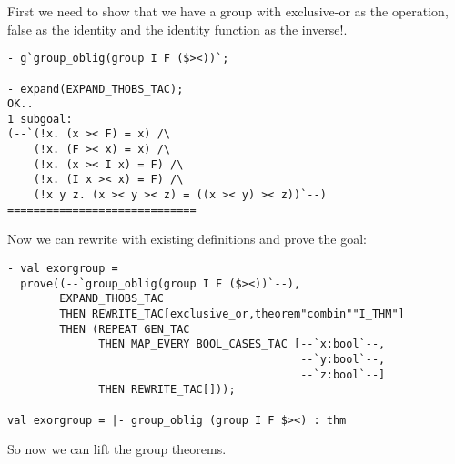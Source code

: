 First we need to show that we have a group with exclusive-or as the
operation, false as the identity and the identity function as the inverse!.

\begin{small}
\begin{verbatim}
- g`group_oblig(group I F ($><))`;

- expand(EXPAND_THOBS_TAC);
OK..
1 subgoal:
(--`(!x. (x >< F) = x) /\
    (!x. (F >< x) = x) /\
    (!x. (x >< I x) = F) /\
    (!x. (I x >< x) = F) /\
    (!x y z. (x >< y >< z) = ((x >< y) >< z))`--)
=============================
\end{verbatim}
\end{small}

Now we can rewrite with existing definitions and prove the goal:

\begin{small}
\begin{verbatim}
- val exorgroup =
  prove((--`group_oblig(group I F ($><))`--),
        EXPAND_THOBS_TAC
        THEN REWRITE_TAC[exclusive_or,theorem"combin""I_THM"]
        THEN (REPEAT GEN_TAC
              THEN MAP_EVERY BOOL_CASES_TAC [--`x:bool`--,
                                             --`y:bool`--,
                                             --`z:bool`--]
              THEN REWRITE_TAC[]));
  
val exorgroup = |- group_oblig (group I F $><) : thm
\end{verbatim}
\end{small}

So now we can lift the group theorems.
  
